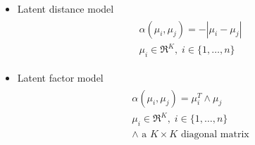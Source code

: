 \begin{itemize}
	\item Latent distance model
		\begin{align}
		\begin{aligned}
			&\alpha(\mu_{i}, \mu_{j}) = -|\mu_{i} - \mu_{j}| \\
			&\mu_{i} \in \Re^{K}, \; i \in \{1, \ldots, n \}
		\end{aligned}
		\end{align}
	\item Latent factor model
		\begin{align}
		\begin{aligned}
			&\alpha(\mu_{i}, \mu_{j}) = \mu_{i}^{T} \wedge \mu_{j} \\
			&\mu_{i} \in \Re^{K}, \; i \in \{1, \ldots, n \} \\
			&\wedge \text{ a } K \times K \text{ diagonal matrix}
		\end{aligned}
		\end{align}
\end{itemize}


